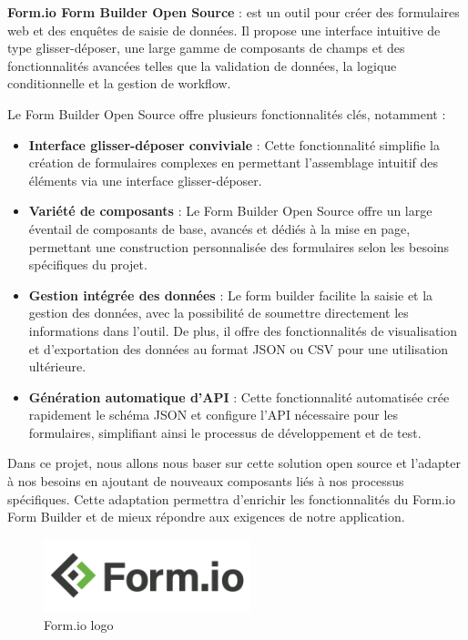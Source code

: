 \textbf{Form.io Form Builder Open Source} \cite{ref8} : est un outil pour créer des formulaires web et des enquêtes de saisie de données. Il propose une interface intuitive de type glisser-déposer, une large gamme de composants de champs et des fonctionnalités avancées telles que la validation de données, la logique conditionnelle et la gestion de workflow.

Le Form Builder Open Source offre plusieurs fonctionnalités clés, notamment :

\begin{itemize}
    \item \textbf{Interface glisser-déposer conviviale} : Cette fonctionnalité simplifie la création de formulaires complexes en permettant l'assemblage intuitif des éléments via une interface glisser-déposer.

    \item \textbf{Variété de composants} : Le Form Builder Open Source offre un large éventail de composants de base, avancés et dédiés à la mise en page, permettant une construction personnalisée des formulaires selon les besoins spécifiques du projet.

    \item \textbf{Gestion intégrée des données} : Le form builder facilite la saisie et la gestion des données, avec la possibilité de soumettre directement les informations dans l'outil. De plus, il offre des fonctionnalités de visualisation et d'exportation des données au format JSON ou CSV pour une utilisation ultérieure.

    \item \textbf{Génération automatique d'API} : Cette fonctionnalité automatisée crée rapidement le schéma JSON et configure l'API nécessaire pour les formulaires, simplifiant ainsi le processus de développement et de test.
\end{itemize}

Dans ce projet, nous allons nous baser sur cette solution open source et l'adapter à nos besoins en ajoutant de nouveaux composants liés à nos processus spécifiques. Cette adaptation permettra d'enrichir les fonctionnalités du Form.io Form Builder et de mieux répondre aux exigences de notre application.
\\
\begin{figure}[H]
    \centering
    \includegraphics[width=6cm]{Figures/dormiologo.png}
    \caption{Form.io logo}
\end{figure}




